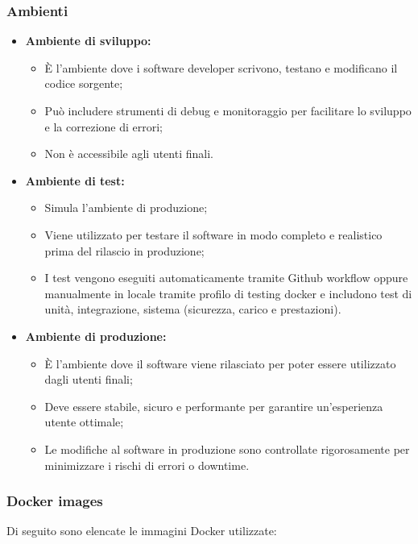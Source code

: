 \subsubsection{Ambienti}
\begin{itemize}
  \item \textbf{Ambiente di sviluppo:}
    \begin{itemize}
      \item È l'ambiente dove i software developer scrivono, testano e modificano il codice sorgente;
      \item Può includere strumenti di debug e monitoraggio per facilitare lo sviluppo e la correzione di errori;
      \item Non è accessibile agli utenti finali.
    \end{itemize}
    \item \textbf{Ambiente di test:}
    \begin{itemize}
      \item Simula l'ambiente di produzione;
      \item Viene utilizzato per testare il software in modo completo e realistico prima del rilascio in produzione;
      \item I test vengono eseguiti automaticamente tramite Github workflow oppure manualmente in locale tramite profilo di testing docker e includono test di unità, integrazione, sistema (sicurezza, carico e prestazioni).
    \end{itemize}
    \item \textbf{Ambiente di produzione:}
    \begin{itemize}
      \item È l'ambiente dove il software viene rilasciato per poter essere utilizzato dagli utenti finali;
      \item Deve essere stabile, sicuro e performante per garantire un'esperienza utente ottimale;
      \item Le modifiche al software in produzione sono controllate rigorosamente per minimizzare i rischi di errori o downtime.
    \end{itemize}
\end{itemize}

\subsubsection{Docker images}

Di seguito sono elencate le immagini Docker utilizzate:


